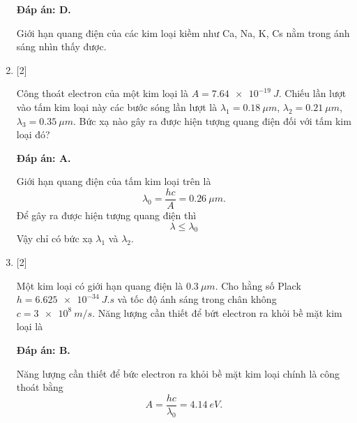 \begin{enumerate}[label=\bfseries Câu \arabic*:]
	\loigiai
	{		\textbf{Đáp án: D.}
		
		Giới hạn quang điện của các kim loại kiềm như Ca, Na, K, Cs nằm trong  ánh sáng nhìn thấy được.
	}
	
	\item {} [2]
	\cauhoi
	{Công thoát electron của một kim loại là $A = \SI{7,64e-19}{J}$. Chiếu lần lượt vào tấm kim loại này các bước sóng lần lượt là $\lambda_{1} = \SI{0,18}{\mu m}$, $\lambda_{2} = \SI{0,21}{\mu m}$, $\lambda_{3} = \SI{0,35}{\mu m}$. Bức xạ nào gây ra được hiện tượng quang điện đối với tấm kim loại đó?
	}
	
	\loigiai
	{		\textbf{Đáp án: A.}
		
		Giới hạn quang điện của tấm kim loại trên là
		$$
		\lambda_{0} = \dfrac{hc}{A} = \SI{0,26}{\mu m}.
		$$
		Để gây ra được hiện tượng quang điện thì
		$$
		\lambda \leq \lambda_{0}
		$$
		Vậy chỉ có bức xạ $\lambda_{1}$ và $\lambda_{2}$.
	}
	
	\item {} [2]
	\cauhoi
	{Một kim loại có giới hạn quang điện là $\SI{0,3}{\mu m}$. Cho hằng số Plack $h = \SI{6,625e-34}{J.s}$ và tốc độ ánh sáng trong chân không $c = \SI{3e8}{m/s}$. Năng lượng cần thiết để bứt electron ra khỏi bề mặt kim loại là
	}
	
	\loigiai
	{		\textbf{Đáp án: B.}
		
		Năng lượng cần thiết để bức electron ra khỏi bề mặt kim loại chính là công thoát bằng
		$$
		A = \dfrac{hc}{\lambda_{0}} = \SI{4,14}{eV}.
		$$
	}
	

\end{enumerate}

